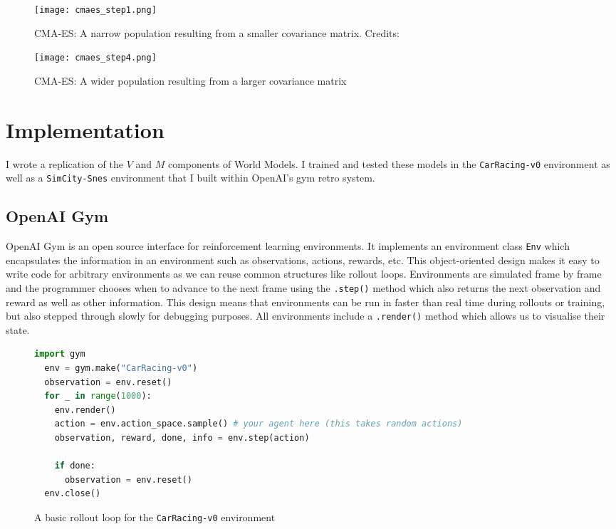\documentclass{article}
\numberwithin{figure}{section}
\theoremstyle{definition}
\begin{document}
\begin{figure}[h]
  \centering
  \begin{minipage}{0.4\textwidth}
      \centering
      \texttt{[image: cmaes\_step1.png]} %
      \caption{CMA-ES: A narrow population resulting from a smaller covariance matrix. Credits: }%
  \end{minipage}\hfill
  \begin{minipage}{0.4\textwidth}
      \centering
      \texttt{[image: cmaes\_step4.png]} %
      \caption{CMA-ES: A wider population resulting from a larger covariance matrix} %
  \end{minipage}
\end{figure}




\section{Implementation}
I wrote a replication of the $V$ and $M$ components of World Models.
I trained and tested these models in the \texttt{CarRacing-v0} environment as well as a \texttt{SimCity-Snes} environment that I built within OpenAI's gym retro system. %

\subsection{OpenAI Gym}
OpenAI Gym is an open source interface for reinforcement learning environments.
It implements an environment class \texttt{Env} which encapsulates the information in an environment such as observations, actions, rewards, etc.
This object-oriented design makes it easy to write code for arbitrary environments as we can reuse common structures like rollout loops.
Environments are simulated frame by frame and the programmer chooses when to advance to the next frame using the \texttt{.step()} method which also returns the next observation and reward as well as other information.
This design means that environments can be run in faster than real time during rollouts or training, but also stepped through slowly for debugging purposes.
All environments include a \texttt{.render()} method which allows us to visualise their state.

\lstset{style=pystyle}
\begin{figure}[h]
\begin{lstlisting}[language=Python]
  import gym
  env = gym.make("CarRacing-v0")
  observation = env.reset()
  for _ in range(1000):
    env.render()
    action = env.action_space.sample() # your agent here (this takes random actions)
    observation, reward, done, info = env.step(action)
  
    if done:
      observation = env.reset()
  env.close()
\end{lstlisting}
\caption{A basic rollout loop for the \texttt{CarRacing-v0} environment}
\end{figure}
\end{document}
